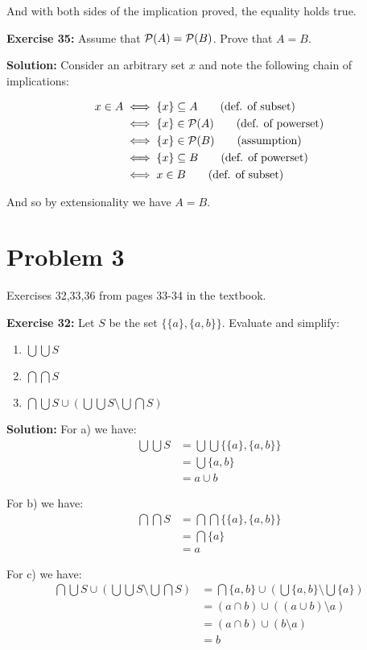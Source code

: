 \documentclass{article}
\begin{document}
And with both sides of the implication proved, the equality holds true.
\bigskip
\pagebreak

\noindent\textbf{Exercise 35:} Assume that $\mathcal P(A) = \mathcal P(B)$. Prove that $A = B$.
\bigskip

\noindent\textbf{Solution:} Consider an arbitrary set $x$ and note the following chain of implications:

\begin{align*}
    x\in A&\iff\{x\}\subseteq A\tag{def. of subset}\\
    &\iff\{x\}\in\mathcal P(A)\tag{def. of powerset}\\
    &\iff\{x\}\in\mathcal P(B)\tag{assumption}\\
    &\iff\{x\}\subseteq B\tag{def. of powerset}\\
    &\iff x\in B\tag{def. of subset}
\end{align*}

And so by extensionality we have $A=B$.

\section*{Problem 3}
Exercises 32,33,36 from pages 33-34 in the textbook.
\bigskip

\noindent\textbf{Exercise 32:} Let $S$ be the set $\{\{a\}, \{a, b\}\}$. Evaluate and simplify:

\begin{enumerate}[label=\alph*)]
    \item $\bigcup\bigcup S$
    \item $\bigcap\bigcap S$
    \item $\bigcap\bigcup S\cup (\bigcup\bigcup S\setminus\bigcup\bigcap S)$
\end{enumerate}
\bigskip

\noindent\textbf{Solution:} For a) we have:
\begin{align*}
    \bigcup\bigcup S&=\bigcup\bigcup\{\{a\}, \{a, b\}\}\\
    &=\bigcup\{a,b\}\\
    &=a\cup b
\end{align*}

For b) we have:
\begin{align*}
    \bigcap\bigcap S&=\bigcap\bigcap\{\{a\}, \{a, b\}\}\\
    &=\bigcap\{a\}\\
    &=a
\end{align*}

For c) we have:
\begin{align*}
    \bigcap\bigcup S\cup \left(\bigcup\bigcup S\setminus\bigcup\bigcap S\right)&=\bigcap\{a,b\}\cup \left(\bigcup\{a,b\}\setminus\bigcup\{a\}\right)\\
    &=(a\cap b)\cup ((a\cup b)\setminus a)\\
    &=(a\cap b)\cup (b\setminus a)\\
    &=b
\end{align*}
\end{document}
